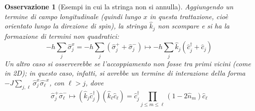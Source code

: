 \documentclass[11pt, a4paper]{scrartcl}
\theoremstyle{style}
\newtheorem{osservazione}{Osservazione}[section]
\theoremstyle{style1}
\numberwithin{equation}{subsection}
\begin{document}
\begin{osservazione}
	[Esempi in cui la stringa non si annulla]
	Aggiungendo un termine di \textit{campo longitudinale} (quindi lungo $x$ in questa trattazione, cio\`e orientato lungo la direzione di spin), la stringa $\hat{k}_j$ non scompare e si ha la formazione di termini non quadratici:
	\[
	- h \sum_{j}^{} \hat{\sigma }_j^x = - h \sum_{j}^{} (\hat{\sigma }_j^+ + \hat{\sigma }_j^-) \longmapsto - h \sum_{j}^{} \hat{k}_j (\hat{c}_j^\dagger + \hat{c}_j)
	\] 
Un altro caso si osserverebbe se l'accoppiamento non fosse tra primi vicini (come in 2D); in questo caso, infatti, si avrebbe un termine di interazione della forma $-J \sum_{j,\ell }^{} \hat{\sigma }_j^x \hat{\sigma _\ell }^x$, con $\ell >j$, dove 
\[
\hat{\sigma }_j^+ \hat{\sigma }^-_\ell \longmapsto (\hat{k}_j \hat{c}^\dagger _j) (\hat{k}_\ell \hat{c}_\ell ) = \hat{c}^\dagger _j \prod_{j\le m\le \ell } \left(1-2 \hat{n}_m\right)\hat{c}_\ell 
\] 
\end{osservazione}
\end{document}
